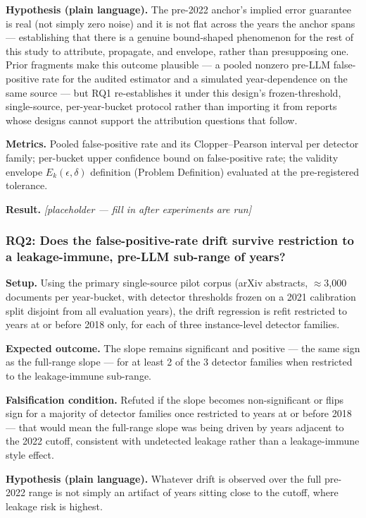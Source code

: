 \documentclass[11pt]{article}
\newcommand{\ph}{\textit{[placeholder --- fill in after experiments are run]}}
\begin{document}
\textbf{Hypothesis (plain language).} The pre-2022 anchor's implied error guarantee is real (not simply zero noise) and it is not flat across the years the anchor spans --- establishing that there is a genuine bound-shaped phenomenon for the rest of this study to attribute, propagate, and envelope, rather than presupposing one. Prior fragments make this outcome plausible --- a pooled nonzero pre-LLM false-positive rate for the audited estimator \citep{LLMGeneratedOrHumanWritten} and a simulated year-dependence on the same source \citep{MovingTargetTTA} --- but RQ1 re-establishes it under this design's frozen-threshold, single-source, per-year-bucket protocol rather than importing it from reports whose designs cannot support the attribution questions that follow.

\textbf{Metrics.} Pooled false-positive rate and its Clopper--Pearson interval per detector family; per-bucket upper confidence bound on false-positive rate; the validity envelope $E_k(\epsilon,\delta)$ definition (Problem Definition) evaluated at the pre-registered tolerance.

\textbf{Result.} \ph

\subsubsection{RQ2: Does the false-positive-rate drift survive restriction to a leakage-immune, pre-LLM sub-range of years?}
\textbf{Setup.} Using the primary single-source pilot corpus (arXiv abstracts, $\approx$3,000 documents per year-bucket, with detector thresholds frozen on a 2021 calibration split disjoint from all evaluation years), the drift regression is refit restricted to years at or before 2018 only, for each of three instance-level detector families.

\textbf{Expected outcome.} The slope remains significant and positive --- the same sign as the full-range slope --- for at least 2 of the 3 detector families when restricted to the leakage-immune sub-range.

\textbf{Falsification condition.} Refuted if the slope becomes non-significant or flips sign for a majority of detector families once restricted to years at or before 2018 --- that would mean the full-range slope was being driven by years adjacent to the 2022 cutoff, consistent with undetected leakage rather than a leakage-immune style effect.

\textbf{Hypothesis (plain language).} Whatever drift is observed over the full pre-2022 range is not simply an artifact of years sitting close to the cutoff, where leakage risk is highest.
\end{document}
